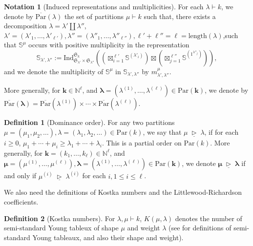 \documentclass{amsart}
\theoremstyle{definition}
\newtheorem{definition}{Definition}
\newtheorem{notation}{Notation}
\theoremstyle{remark}
\numberwithin{equation}{section}
\begin{document}
\begin{notation}[Induced representations and multiplicities]
\label{not:induced-rep-and-mult}
For each $\lambda \vdash k$,
we denote by $\overline{\mathrm{Par}}(\lambda)$ the set of partitions $\mu \vdash k$ such that,
there exists a decomposition $\lambda = \lambda' \coprod \lambda''$, 
$\lambda' = (\lambda'_1,\ldots,\lambda'_{\ell'}), \lambda''=(\lambda''_1,\ldots,\lambda''_{\ell''}), \ell'+\ell''=\ell = {\mathrm{length}}(\lambda)$,such that $\mathbb{S}^\mu$ occurs with positive multiplicity
in the representation 
\[
\mathbb{S}_{\lambda',\lambda''} := 
{\mathrm{Ind}}_{\mathfrak{S}_{\lambda'} \times \mathfrak{S}_{\lambda''}}^{\mathfrak{S}_k}\left(\left(\boxtimes_{i=1}^{\ell'} \mathbb{S}^{(\lambda'_i)}\right) \boxtimes \left(\boxtimes_{j=1}^{\ell''} \mathbb{S}^{(1^{\lambda''_j})}\right) \right),
\] 
and we denote the multiplicity of $\mathbb{S}^\mu$ in $\mathbb{S}_{\lambda',\lambda''}$  by $m^\mu_{\lambda',\lambda''}$.

More generally, for ${\mathbf{k}} \in {\mathbb{N}}^\ell$, and $\pmb{\lambda}= (\lambda^{(1)},\ldots,\lambda^{(\ell)}) \in {\mathrm{Par}}({\mathbf{k}})$, we denote by 
$\overline{\mathrm{Par}}(\pmb{\lambda}) = \overline{\mathrm{Par}}(\lambda^{(1)}) \times \cdots \times \overline{\mathrm{Par}}(\lambda^{(\ell)})$.
\end{notation}

\begin{definition}[Dominance order]
\label{def:dominance}
For any two partitions $\mu=(\mu_1,\mu_2,\ldots),\lambda=(\lambda_1,\lambda_2,\ldots) \in {\mathrm{Par}}(k)$,
we say that $\mu {{\;\underline{\triangleright}\;}} \lambda$, if for each $i\geq 0$, $\mu_1+\cdots+\mu_i \geq \lambda_1+\cdots+\lambda_i$.
This is a partial order on ${\mathrm{Par}}(k)$.
More generally, for ${\mathbf{k}} = (k_1,\ldots,k_\ell) \in {\mathbb{N}}^\ell$,
and $\pmb{\mu} = (\mu^{(1)},\ldots,\mu^{(\ell)}), \pmb{\lambda} = (\lambda^{(1)},\ldots,\lambda^{(\ell)}) \in {\mathrm{Par}}({\mathbf{k}})$, we denote
$\pmb{\mu} {{\;\underline{\triangleright}\;}} \pmb{\lambda}  $ if and only if $ \mu^{(i)} {{\;\underline{\triangleright}\;}} \lambda^{(i)} $ for each $i, 1\leq i \leq \ell$.
\end{definition}

We also need the definitions of Kostka numbers and the Littlewood-Richardson coefficients.

\begin{definition}[Kostka numbers]
\label{def:Kostka}
For $\lambda,\mu \vdash k$, $K(\mu,\lambda)$ denotes the number of semi-standard Young tableux of
shape $\mu$ and weight $\lambda$ (see \cite{Procesi-book} for definitions of semi-standard Young tableaux, and 
also their shape and weight). 
\end{definition} 
\end{document}
